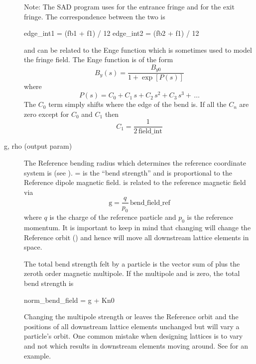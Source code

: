 \begin{description}
Note: The SAD program uses  for the entrance fringe and  for the exit
fringe. The correspondence between the two is
\begin{example2}
  edge_int1 = (fb1 + f1) / 12
  edge_int2 = (fb2 + f1) / 12
\end{example2}

 and  can be related to the Enge function which is sometimes used to model the
fringe field. The Enge function is of the form
\begin{equation}
  B_y(s) = \frac{B_{y0}}{1 + \exp[P(s)]}
\end{equation}
where
\begin{equation}
  P(s) = C_0 + C_1 \, s + C_2 \, s^2 + C_3 \, s^3 + \, \ldots
\end{equation}
The $C_0$ term simply shifts where the edge of the bend is. If all the $C_n$ are zero except for
$C_0$ and $C_1$ then
\begin{equation}
  C_1 = \frac{1}{2 \, \text{field_int}}
\end{equation}
  \item[g, rho (output param)] \Newline
The Reference bending radius which determines the reference coordinate system is  (see
).  =  is the ``bend strength'' and is proportional to the Reference
dipole magnetic field.  is related to the reference magnetic field  via
\begin{equation}
  \text{g} = \frac{q}{p_0} \, \text{bend_field_ref} 
  \label{gqpb}
\end{equation}
where $q$ is the charge of the reference particle and $p_0$ is the reference momentum. It is
important to keep in mind that changing  will change the Reference orbit () and
hence will move all downstream lattice elements in space.

The total bend strength felt by a particle is the vector sum of  plus the zeroth order
magnetic multipole. If the multipole  and  is zero, the total bend strength is
\begin{example}
  norm_bend_field = g + Kn0
\end{example}
Changing the multipole strength  or  leaves the Reference orbit and the positions of
all downstream lattice elements
unchanged but will vary a particle's orbit. One common mistake when designing lattices is to vary
 and not  which results in downstream elements moving around. See 
for an example.


\end{description}

